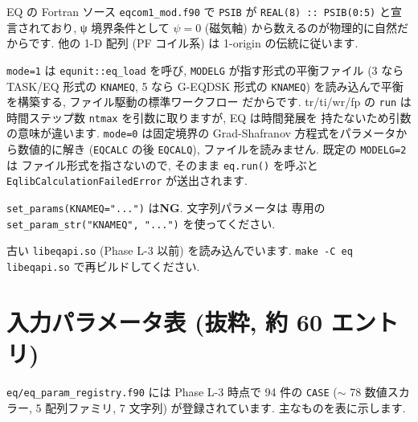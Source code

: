 \documentclass[11pt,a4paper]{report}
\begin{document}
\begin{faq}
EQ の Fortran ソース \texttt{eqcom1\_mod.f90} で \texttt{PSIB} が
\texttt{REAL(8) :: PSIB(0:5)} と宣言されており, ψ 境界条件として
\(\psi = 0\) (磁気軸) から数えるのが物理的に自然だからです.
他の 1-D 配列 (PF コイル系) は 1-origin の伝統に従います.
\end{faq}

\begin{faq}[Q2. なぜ \texttt{eq.run()} のデフォルトが \texttt{mode=1}?]
\texttt{mode=1} は \texttt{equnit::eq\_load} を呼び, \texttt{MODELG}
が指す形式の平衡ファイル (3 なら TASK/EQ 形式の \texttt{KNAMEQ}, 5 なら
G-EQDSK 形式の \texttt{KNAMEQ}) を読み込んで平衡を構築する, ファイル駆動の標準ワークフロー
だからです. tr/ti/wr/fp の \texttt{run}
は時間ステップ数 \texttt{ntmax} を引数に取りますが, EQ は時間発展を
持たないため引数の意味が違います. \texttt{mode=0} は固定境界の
Grad-Shafranov 方程式をパラメータから数値的に解き (\texttt{EQCALC} の後
\texttt{EQCALQ}), ファイルを読みません. 既定の \texttt{MODELG=2} は
ファイル形式を指さないので, そのまま \texttt{eq.run()} を呼ぶと
\texttt{EqlibCalculationFailedError} が送出されます.
\end{faq}

\begin{faq}
\texttt{set\_params(KNAMEQ="...")} は\textbf{NG}. 文字列パラメータは
専用の \texttt{set\_param\_str("KNAMEQ", "...")} を使ってください.
\end{faq}

\begin{faq}
古い \texttt{libeqapi.so} (Phase L-3 以前) を読み込んでいます.
\texttt{make -C eq libeqapi.so} で再ビルドしてください.
\end{faq}

\section{入力パラメータ表 (抜粋, 約 60 エントリ)}

\texttt{eq/eq\_param\_registry.f90} には Phase L-3 時点で 94 件の
\texttt{CASE} (\(\sim\) 78 数値スカラー, 5 配列ファミリ, 7 文字列)
が登録されています. 主なものを表に示します.
\end{document}
